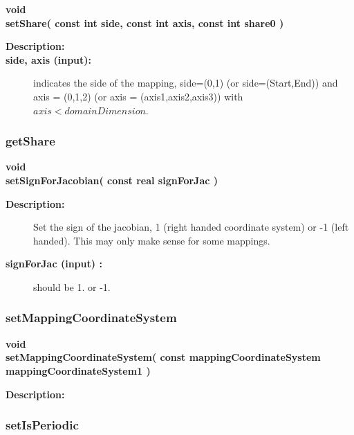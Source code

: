 \begin{flushleft} \textbf{%
void  \\ 
\settowidth{\MappingIncludeArgIndent}{setShare(}%
setShare( const int side, const int axis, const int share0 )
}\end{flushleft}
\begin{description}
\item[{\bf Description:}] 
\item[{\bf side, axis (input):}]  indicates the side of the mapping, side=(0,1) (or side=(Start,End)) 
     and axis = (0,1,2) (or axis = (axis1,axis2,axis3)) with $axis<domainDimension$.
\end{description}
\subsubsection{getShare}
 
\begin{flushleft} \textbf{%
void  \\ 
\settowidth{\MappingIncludeArgIndent}{setSignForJacobian(}%
setSignForJacobian( const real signForJac )
}\end{flushleft}
\begin{description}
\item[{\bf Description:}] 
   Set the sign of the jacobian, 1 (right handed coordinate system) or -1 (left handed).
  This may only make sense for some mappings.
\item[{\bf signForJac (input) :}]  should be 1. or -1.
\end{description}
\subsubsection{setMappingCoordinateSystem}
 
\begin{flushleft} \textbf{%
void  \\ 
\settowidth{\MappingIncludeArgIndent}{setMappingCoordinateSystem(}%
setMappingCoordinateSystem( const mappingCoordinateSystem mappingCoordinateSystem1 )
}\end{flushleft}
\begin{description}
\item[{\bf Description:}] 
\end{description}
\subsubsection{setIsPeriodic}
 
